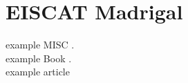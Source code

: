 
\section{EISCAT Madrigal}
example MISC \cite{exampleMISC}.\\
example Book \cite{exampleBOOK}.\\
example article \cite[p.~5]{exampleARTICLE}